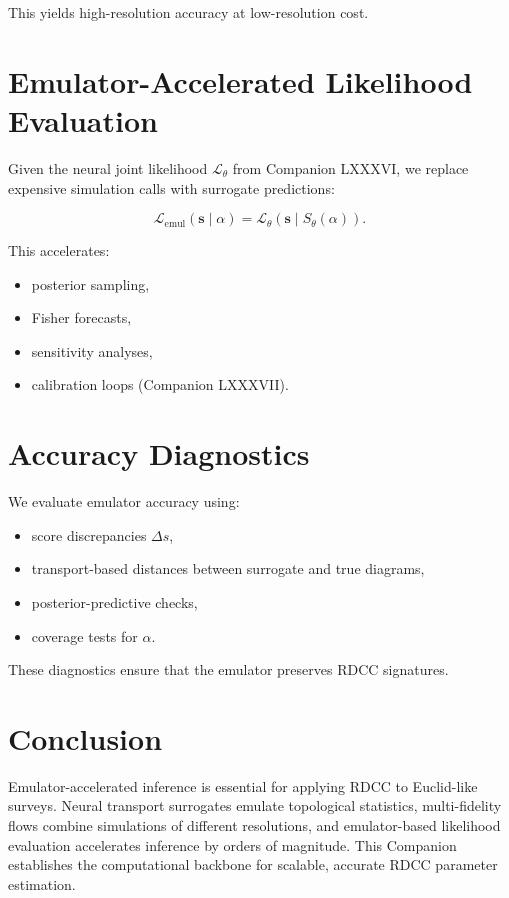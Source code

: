 \documentclass[11pt,a4paper]{article}
\begin{document}
This yields high-resolution accuracy at low-resolution cost.
\section{Emulator-Accelerated Likelihood Evaluation}

Given the neural joint likelihood $\mathcal{L}_{\theta}$ from Companion LXXXVI, 
we replace expensive simulation calls with surrogate predictions:



\[
    \mathcal{L}_{\mathrm{emul}}(\mathbf{s} \mid \alpha)
    =
    \mathcal{L}_{\theta}\!\left(
        \mathbf{s} \mid S_{\theta}(\alpha)
    \right).
\]



This accelerates:

\begin{itemize}
    \item posterior sampling,
    \item Fisher forecasts,
    \item sensitivity analyses,
    \item calibration loops (Companion LXXXVII).
\end{itemize}
\section{Accuracy Diagnostics}

We evaluate emulator accuracy using:

\begin{itemize}
    \item score discrepancies $\Delta s$,
    \item transport-based distances between surrogate and true diagrams,
    \item posterior-predictive checks,
    \item coverage tests for $\alpha$.
\end{itemize}

These diagnostics ensure that the emulator preserves RDCC signatures.
\section{Conclusion}

Emulator-accelerated inference is essential for applying RDCC to Euclid-like 
surveys. Neural transport surrogates emulate topological statistics, 
multi-fidelity flows combine simulations of different resolutions, and 
emulator-based likelihood evaluation accelerates inference by orders of 
magnitude. This Companion establishes the computational backbone for scalable, 
accurate RDCC parameter estimation.


\nocite{*}

\end{document}
